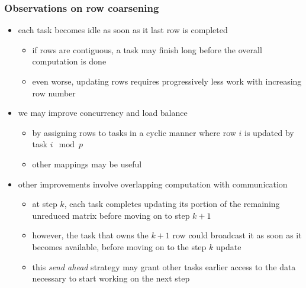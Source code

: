 \begin{frame}[fragile]
%
  \frametitle{Observations on row coarsening}
%
  \begin{itemize}
%
  \item each task becomes idle as soon as it last row is completed
    \begin{itemize}
    \item if rows are contiguous, a task may finish long before the overall computation is done
    \item even worse, updating rows requires progressively less work with increasing row number
    \end{itemize}
%
  \item we may improve concurrency and load balance 
    \begin{itemize}
    \item by assigning rows to tasks in a cyclic manner where row $i$ is updated by task $i
      \mod p$
    \item other mappings may be useful
    \end{itemize}
%
  \item other improvements involve overlapping computation with communication
    \begin{itemize}
    \item at step $k$, each task completes updating its portion of the remaining unreduced
      matrix before moving on to step $k+1$
    \item however, the task that owns the $k+1$ row could broadcast it as soon as it becomes
      available, before moving on to the step $k$ update
    \item this {\em send ahead} strategy may grant other tasks earlier access to the data
      necessary to start working on the next step
    \end{itemize}
%
  \end{itemize}
%
\end{frame}

